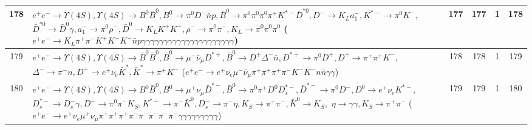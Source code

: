 \documentclass[landscape]{article}
\begin{document}
\begin{table}[htbp!]
\begin{tabular}{|c|>{\centering}p{18cm}|c|c|c|c|}
\hline
178 & \makecell{ $ 
e^{+} e^{-} \rightarrow \Upsilon(4S) ,
\Upsilon(4S) \rightarrow B^{0} \bar{B}^{0} ,
B^{0} \rightarrow \pi^{0} D^{-} \bar{n} p ,
\bar{B}^{0} \rightarrow \pi^{0} \pi^{0} \pi^{0} \pi^{+} K^{*-} \bar{D}^{*0} ,
D^{-} \rightarrow K_{L} a_{1}^{-} ,
K^{*-} \rightarrow \pi^{0} K^{-} ,
$ \\ $
\bar{D}^{*0} \rightarrow \bar{D}^{0} \gamma ,
a_{1}^{-} \rightarrow \pi^{0} \rho^{-} ,
\bar{D}^{0} \rightarrow K_{L} K^{+} K^{-} ,
\rho^{-} \rightarrow \pi^{0} \pi^{-} ,
K_{L} \rightarrow \pi^{0} \pi^{0} \pi^{0} 
$ \\ ($
e^{+} e^{-} \rightarrow K_{L} \pi^{+} \pi^{-} K^{+} K^{-} K^{-} \bar{n} p \gamma \gamma \gamma \gamma \gamma \gamma \gamma \gamma \gamma \gamma \gamma \gamma \gamma \gamma \gamma \gamma \gamma \gamma \gamma \gamma \gamma 
$) } & 177 & 177 & 1 & 178 \\
\hline
179 & \makecell{ $ 
e^{+} e^{-} \rightarrow \Upsilon(4S) ,
\Upsilon(4S) \rightarrow \bar{B}^{0} \bar{B}^{0} ,
\bar{B}^{0} \rightarrow \mu^{-} \bar{\nu}_{\mu} D^{*+} ,
\bar{B}^{0} \rightarrow D^{+} \Delta^{-} \bar{n} ,
D^{*+} \rightarrow \pi^{0} D^{+} ,
D^{+} \rightarrow \pi^{+} \pi^{+} K^{-} ,
$ \\ $
\Delta^{-} \rightarrow \pi^{-} n ,
D^{+} \rightarrow e^{+} \nu_{e} \bar{K}^{*} ,
\bar{K}^{*} \rightarrow \pi^{+} K^{-} 
$ \\ ($
e^{+} e^{-} \rightarrow e^{+} \nu_{e} \mu^{-} \bar{\nu}_{\mu} \pi^{+} \pi^{+} \pi^{+} \pi^{-} K^{-} K^{-} n \bar{n} \gamma \gamma 
$) } & 178 & 178 & 1 & 179 \\
\hline
180 & \makecell{ $ 
e^{+} e^{-} \rightarrow \Upsilon(4S) ,
\Upsilon(4S) \rightarrow B^{0} \bar{B}^{0} ,
B^{0} \rightarrow \mu^{+} \nu_{\mu} \bar{D}^{*-} ,
\bar{B}^{0} \rightarrow \pi^{0} \pi^{+} D^{0} D_{s}^{*-} ,
\bar{D}^{*-} \rightarrow \pi^{0} D^{-} ,
D^{0} \rightarrow e^{+} \nu_{e} K^{*-} ,
$ \\ $
D_{s}^{*-} \rightarrow D_{s}^{-} \gamma ,
D^{-} \rightarrow \pi^{0} \pi^{-} K_{S} ,
K^{*-} \rightarrow \pi^{-} \bar{K}^{0} ,
D_{s}^{-} \rightarrow \pi^{-} \eta ,
K_{S} \rightarrow \pi^{+} \pi^{-} ,
\bar{K}^{0} \rightarrow K_{S} ,
$ \\ $
\eta \rightarrow \gamma \gamma ,
K_{S} \rightarrow \pi^{+} \pi^{-} 
$ \\ ($
e^{+} e^{-} \rightarrow e^{+} \nu_{e} \mu^{+} \nu_{\mu} \pi^{+} \pi^{+} \pi^{+} \pi^{-} \pi^{-} \pi^{-} \pi^{-} \pi^{-} \gamma \gamma \gamma \gamma \gamma \gamma \gamma \gamma \gamma 
$) } & 179 & 179 & 1 & 180 \\

\end{tabular}
\end{table}
\end{document}
